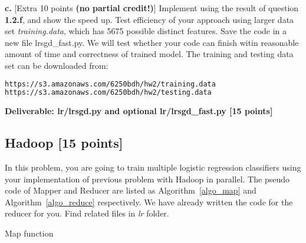 \documentclass[12pt]{article}
\begin{document}
\textbf{c.} [Extra 10 points \textbf{(no partial credit!)}] Implement using the result of question \textbf{1.2.f}, and show the speed up. Test efficiency of your approach using larger data set \textit{training.data}, which has 5675 possible distinct features. Save the code in a new file lrsgd\_fast.py. We will test whether your code can finish witin reasonable amount of time and correctness of trained model. The training and testing data set can be downloaded from:

\begin{lstlisting}[frame=single,language=bash]
https://s3.amazonaws.com/6250bdh/hw2/training.data 
https://s3.amazonaws.com/6250bdh/hw2/testing.data
\end{lstlisting}



\textbf{Deliverable: lr/lrsgd.py and optional lr/lrsgd\_fast.py [15 points]}

\subsection{Hadoop [15 points]}
In this problem, you are going to train multiple logistic regression classifiers using your implementation of previous problem with Hadoop in parallel. The pseudo code of Mapper and Reducer are listed as Algorithm~\ref{algo_map} and Algorithm~\ref{algo_reduce} respectively. We have already written the code for the reducer for you. Find related files in \textit{lr} folder.

\begin{algorithm}
\BlankLine
{}
\caption{Map function}\label{algo_map}
\end{algorithm}
\end{document}
